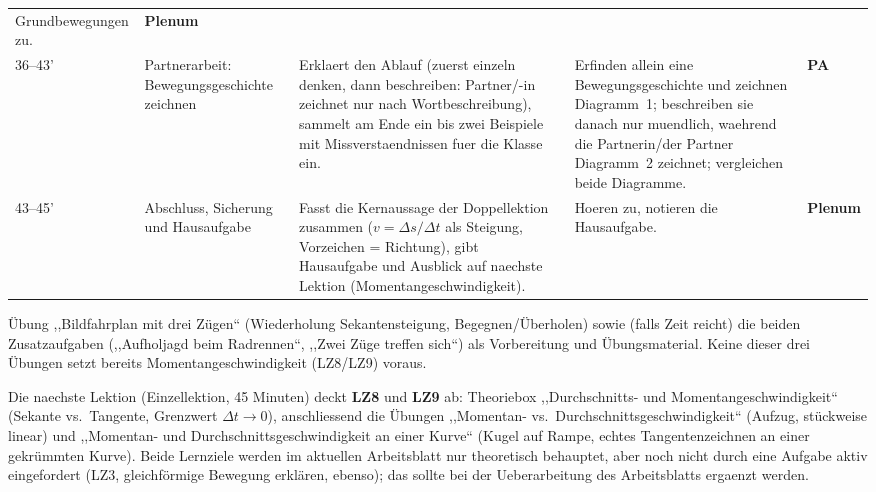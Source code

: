 \documentclass[11pt,a4paper]{article}
\newcommand{\PA}{\textcolor{groupteal}{\textbf{PA}}}
\newcommand{\PL}{\textcolor{titleblue}{\textbf{Plenum}}}
\begin{document}
\begin{longtable}{Z|I|L|U|F}
Grundbewegungen zu. &
\PL{} \\
36--43' &
Partnerarbeit: Bewegungsgeschichte zeichnen &
Erklaert den Ablauf (zuerst einzeln denken, dann beschreiben:
Partner/-in zeichnet nur nach Wortbeschreibung), sammelt am Ende ein bis
zwei Beispiele mit Missverstaendnissen fuer die Klasse ein. &
Erfinden allein eine Bewegungsgeschichte und zeichnen Diagramm~1;
beschreiben sie danach nur muendlich, waehrend die Partnerin/der Partner
Diagramm~2 zeichnet; vergleichen beide Diagramme. &
\PA{} \\
43--45' &
Abschluss, Sicherung und Hausaufgabe &
Fasst die Kernaussage der Doppellektion zusammen ($v=\Delta s/\Delta t$
als Steigung, Vorzeichen = Richtung), gibt Hausaufgabe und Ausblick auf
naechste Lektion (Momentangeschwindigkeit). &
Hoeren zu, notieren die Hausaufgabe. &
\PL{} \\
\bottomrule
\end{longtable}

\begin{hinweisbox}[Hausaufgabe]
Übung ,,Bildfahrplan mit drei Zügen`` (Wiederholung Sekantensteigung,
Begegnen/Überholen) sowie (falls Zeit reicht) die beiden
Zusatzaufgaben (,,Aufholjagd beim Radrennen``, ,,Zwei Züge treffen sich``)
als Vorbereitung und Übungsmaterial. Keine dieser drei Übungen setzt bereits
Momentangeschwindigkeit (LZ8/LZ9) voraus.
\end{hinweisbox}

\begin{hinweisbox}
Die naechste Lektion (Einzellektion, 45 Minuten) deckt \textbf{LZ8} und
\textbf{LZ9} ab: Theoriebox ,,Durchschnitts- und Momentangeschwindigkeit``
(Sekante vs.\ Tangente, Grenzwert $\Delta t \to 0$), anschliessend die
Übungen ,,Momentan- vs.\ Durchschnittsgeschwindigkeit`` (Aufzug,
stückweise linear) und ,,Momentan- und Durchschnittsgeschwindigkeit an
einer Kurve`` (Kugel auf Rampe, echtes Tangentenzeichnen an einer
gekrümmten Kurve). Beide Lernziele werden im aktuellen Arbeitsblatt nur
theoretisch behauptet, aber noch nicht durch eine Aufgabe aktiv
eingefordert (LZ3, gleichförmige Bewegung erklären, ebenso); das sollte
bei der Ueberarbeitung des Arbeitsblatts ergaenzt werden.
\end{hinweisbox}
\end{document}
